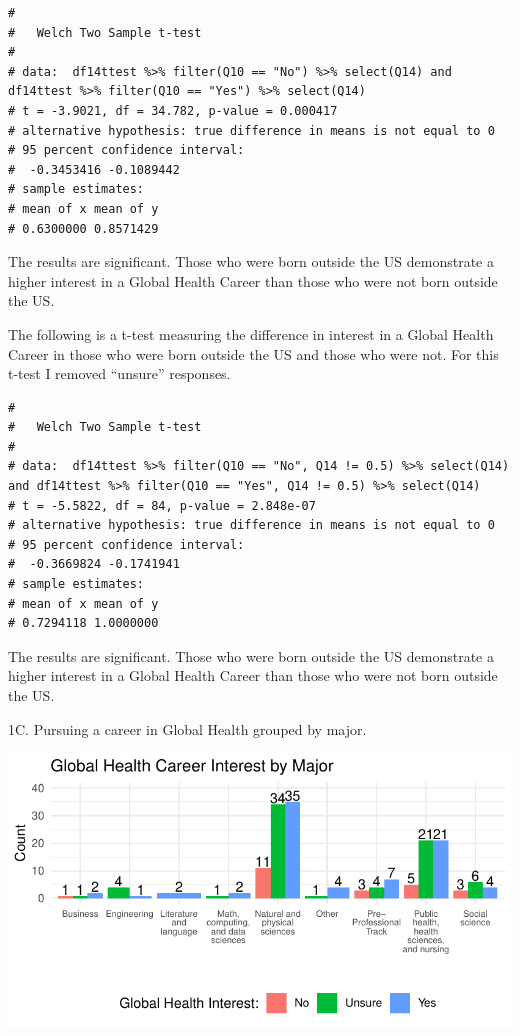 \documentclass[
  letterpaper,
  DIV=11,
  numbers=noendperiod]{scrartcl}
\begin{document}
\begin{verbatim}
# 
#   Welch Two Sample t-test
# 
# data:  df14ttest %>% filter(Q10 == "No") %>% select(Q14) and df14ttest %>% filter(Q10 == "Yes") %>% select(Q14)
# t = -3.9021, df = 34.782, p-value = 0.000417
# alternative hypothesis: true difference in means is not equal to 0
# 95 percent confidence interval:
#  -0.3453416 -0.1089442
# sample estimates:
# mean of x mean of y 
# 0.6300000 0.8571429
\end{verbatim}

The results are significant. Those who were born outside the US
demonstrate a higher interest in a Global Health Career than those who
were not born outside the US.

The following is a t-test measuring the difference in interest in a
Global Health Career in those who were born outside the US and those who
were not. For this t-test I removed ``unsure'' responses.

\begin{verbatim}
# 
#   Welch Two Sample t-test
# 
# data:  df14ttest %>% filter(Q10 == "No", Q14 != 0.5) %>% select(Q14) and df14ttest %>% filter(Q10 == "Yes", Q14 != 0.5) %>% select(Q14)
# t = -5.5822, df = 84, p-value = 2.848e-07
# alternative hypothesis: true difference in means is not equal to 0
# 95 percent confidence interval:
#  -0.3669824 -0.1741941
# sample estimates:
# mean of x mean of y 
# 0.7294118 1.0000000
\end{verbatim}

The results are significant. Those who were born outside the US
demonstrate a higher interest in a Global Health Career than those who
were not born outside the US.

\newpage

1C. Pursuing a career in Global Health grouped by major.

\includegraphics{GlobalHealthQuartoHC_files/figure-pdf/unnamed-chunk-21-1.pdf}
\end{document}
